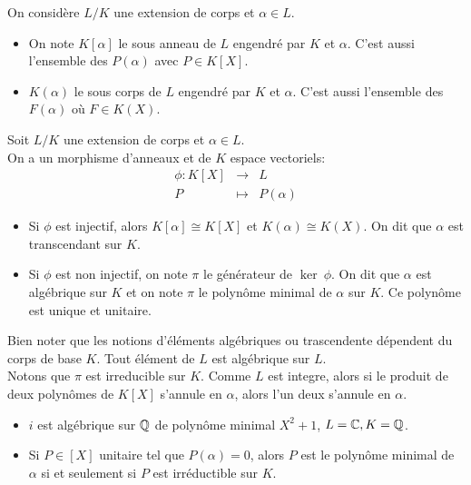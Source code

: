 \begin{definition}
	On considère $L/K$ une extension de corps et $\alpha \in L$. \\
	\begin{itemize}
		\item On note $K[\alpha]$ le sous anneau de $L$ engendré par $K$ et $\alpha$. C'est aussi l'ensemble des $P(\alpha)$ avec $P \in K[X]$.
		\item $K(\alpha)$ le sous corps de $L$ engendré par $K$ et $\alpha$. C'est aussi l'ensemble des $F(\alpha)$ où $F \in K(X)$.
	\end{itemize}
\end{definition}


\begin{definition}
	Soit $L/K$ une extension de corps et $\alpha \in L$.\\
	On a un morphisme d'anneaux et de $K$ espace vectoriels:
	\begin{eqnarray*}
		\phi: K[X] &\to& L \\
		P &\mapsto& P(\alpha)
	\end{eqnarray*}
	\begin{itemize}
		\item Si $\phi$ est injectif, alors $K[\alpha] \cong K[X]$ et $K(\alpha) \cong K(X)$. On dit que $\alpha$ est transcendant sur $K$.
		\item Si $\phi$ est non injectif, on note $\pi$ le générateur de $\ker\ \phi$. On dit que $\alpha$ est algébrique sur $K$ et on note $\pi$ le polynôme minimal de
		      $\alpha$ sur $K$. Ce polynôme est unique et unitaire.
	\end{itemize}
\end{definition}

\begin{remarque}
	Bien noter que les notions d'éléments algébriques ou trascendente dépendent du corps de base $K$. Tout élément de $L$ est algébrique sur $L$.\\
	Notons que $\pi$ est irreducible sur $K$. Comme $L$ est integre, alors si le produit de deux polynômes de $K[X]$ s'annule en $\alpha$, alors l'un deux s'annule en $\alpha$.
\end{remarque}

\begin{example}
	\begin{itemize}
		\item $i$ est algébrique sur $\mathbb{Q}$ de polynôme minimal $X^2+1$, $L = \mathbb{C}, K = \mathbb{Q}$.
		\item Si $P \in [X]$ unitaire tel que $P(\alpha) = 0$, alors $P$ est le polynôme minimal de $\alpha$ si et seulement si $P$ est irréductible sur $K$.
	\end{itemize}
\end{example}

